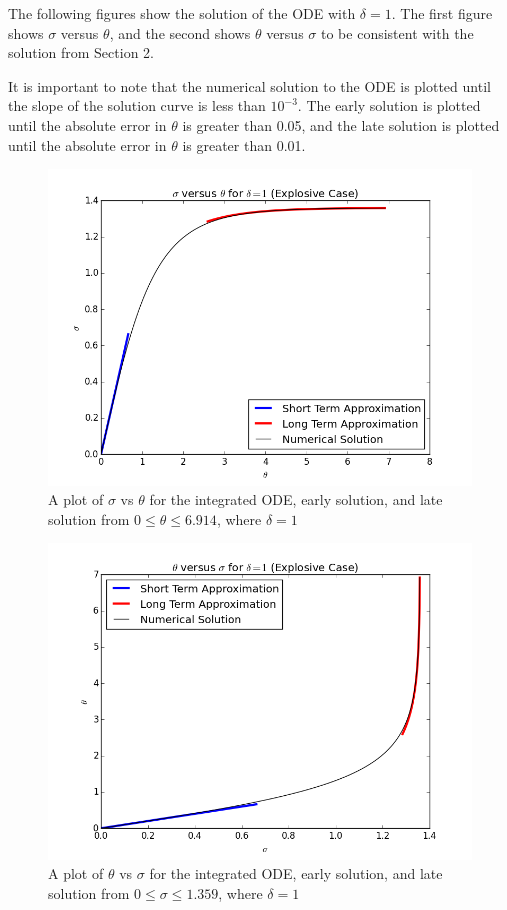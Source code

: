 \documentclass[12pt]{article}\pagestyle{myheadings}
\theoremstyle{plain}
\begin{document}
The following figures show the solution of the ODE with $\delta = 1$. The first figure shows $\sigma$ versus $\theta$, and the second shows $\theta$  versus $\sigma$ to be consistent with the solution from Section 2.

It is important to note that the numerical solution to the ODE is plotted until the slope of the solution curve is less than $10^{-3}$. The early solution is plotted until the absolute error in $\theta$ is greater than 0.05, and the late solution is plotted until the absolute error in $\theta$ is greater than 0.01.

\begin{figure}[h]
\centering
\includegraphics[scale=0.75]{sig_vs_th.png}
\caption{A plot of $\sigma$ vs $\theta$ for the integrated ODE, early solution, and late solution from $0 \le \theta \le 6.914$, where $\delta = 1$}
\label{fig:Part1}
\end{figure}

\begin{figure}[ht!]
\centering
\includegraphics[scale=0.75]{th_vs_sig.png}
\caption{A plot of $\theta$ vs $\sigma$ for the integrated ODE, early solution, and late solution from $0 \le \sigma \le 1.359$, where $\delta = 1$}
\label{fig:Part1}
\end{figure}
\end{document}
